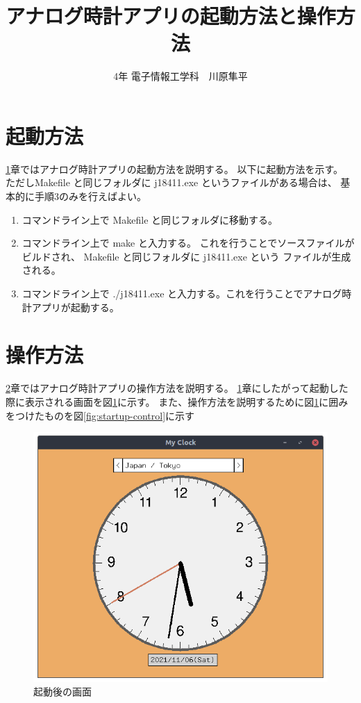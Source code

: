 \documentclass[a4paper,11pt]{jsarticle}
\begin{document}
\title{アナログ時計アプリの起動方法と操作方法}
\author{4年 電子情報工学科　川原隼平}
\date{}
\maketitle
  \section{起動方法}\label{sec:startup}
    \ref{sec:startup}章ではアナログ時計アプリの起動方法を説明する。
    以下に起動方法を示す。
    ただしMakefile と同じフォルダに j18411.exe というファイルがある場合は、
    基本的に手順3のみを行えばよい。

    \begin{enumerate}
      \item コマンドライン上で Makefile と同じフォルダに移動する。
      \item コマンドライン上で make と入力する。
      これを行うことでソースファイルがビルドされ、 Makefile と同じフォルダに j18411.exe という
      ファイルが生成される。
      \item コマンドライン上で ./j18411.exe と入力する。これを行うことでアナログ時計アプリが起動する。
    \end{enumerate}

  \section{操作方法}\label{sec:control}
    \ref{sec:control}章ではアナログ時計アプリの操作方法を説明する。
    \ref{sec:startup}章にしたがって起動した際に表示される画面を図\ref{fig:startup}に示す。
    また、操作方法を説明するために図\ref{fig:startup}に囲みをつけたものを図\ref{fig:startup-control}に示す

    \begin{figure}[H]
      \centering
      \includegraphics[scale=0.3]{./src/startup.png}
      \caption{起動後の画面}
      \label{fig:startup}
    \end{figure}
\end{document}
